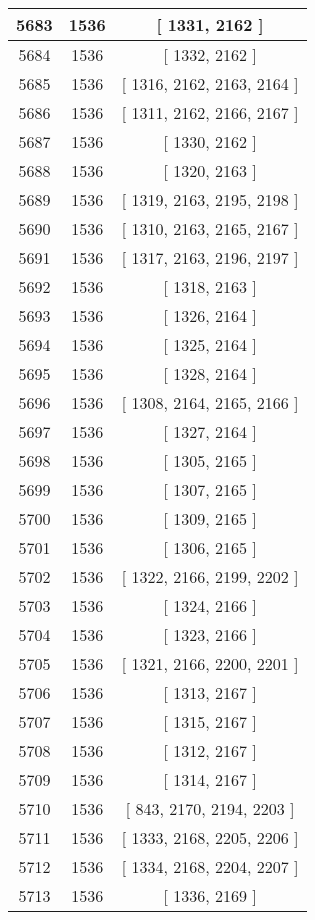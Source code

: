\begin{center}
\begin{longtable}[H]{|| c c c ||}
\hline
5683 & 1536 & [ 1331, 2162 ] \\ 
\hline
5684 & 1536 & [ 1332, 2162 ] \\ 
\hline
5685 & 1536 & [ 1316, 2162, 2163, 2164 ] \\ 
\hline
5686 & 1536 & [ 1311, 2162, 2166, 2167 ] \\ 
\hline
5687 & 1536 & [ 1330, 2162 ] \\ 
\hline
5688 & 1536 & [ 1320, 2163 ] \\ 
\hline
5689 & 1536 & [ 1319, 2163, 2195, 2198 ] \\ 
\hline
5690 & 1536 & [ 1310, 2163, 2165, 2167 ] \\ 
\hline
5691 & 1536 & [ 1317, 2163, 2196, 2197 ] \\ 
\hline
5692 & 1536 & [ 1318, 2163 ] \\ 
\hline
5693 & 1536 & [ 1326, 2164 ] \\ 
\hline
5694 & 1536 & [ 1325, 2164 ] \\ 
\hline
5695 & 1536 & [ 1328, 2164 ] \\ 
\hline
5696 & 1536 & [ 1308, 2164, 2165, 2166 ] \\ 
\hline
5697 & 1536 & [ 1327, 2164 ] \\ 
\hline
5698 & 1536 & [ 1305, 2165 ] \\ 
\hline
5699 & 1536 & [ 1307, 2165 ] \\ 
\hline
5700 & 1536 & [ 1309, 2165 ] \\ 
\hline
5701 & 1536 & [ 1306, 2165 ] \\ 
\hline
5702 & 1536 & [ 1322, 2166, 2199, 2202 ] \\ 
\hline
5703 & 1536 & [ 1324, 2166 ] \\ 
\hline
5704 & 1536 & [ 1323, 2166 ] \\ 
\hline
5705 & 1536 & [ 1321, 2166, 2200, 2201 ] \\ 
\hline
5706 & 1536 & [ 1313, 2167 ] \\ 
\hline
5707 & 1536 & [ 1315, 2167 ] \\ 
\hline
5708 & 1536 & [ 1312, 2167 ] \\ 
\hline
5709 & 1536 & [ 1314, 2167 ] \\ 
\hline
5710 & 1536 & [ 843, 2170, 2194, 2203 ] \\ 
\hline
5711 & 1536 & [ 1333, 2168, 2205, 2206 ] \\ 
\hline
5712 & 1536 & [ 1334, 2168, 2204, 2207 ] \\ 
\hline
5713 & 1536 & [ 1336, 2169 ] \\ 

\end{longtable}
\end{center}

